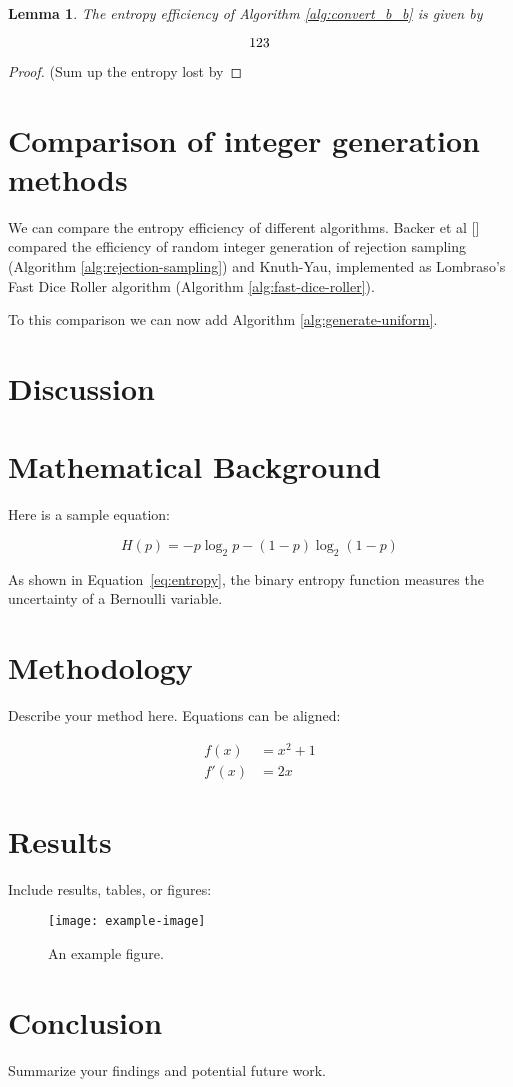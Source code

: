 \documentclass[12pt]{article}
\newtheorem{lemma}{Lemma}
\begin{document}
\begin{lemma}
The entropy efficiency of Algorithm \ref{alg:convert_b_b} is given by 

\begin{equation}
$$123$$
\end{equation}

\end{lemma}

\begin{proof}
(Sum up the entropy lost by 

\end{proof}

\section {Comparison of integer generation methods}

We can compare the entropy efficiency of different algorithms. Backer et al [] compared the efficiency of random integer generation of rejection sampling (Algorithm \ref{alg:rejection-sampling}) and Knuth-Yau, implemented as Lombraso's Fast Dice Roller algorithm (Algorithm \ref{alg:fast-dice-roller}).

To this comparison we can now add Algorithm \ref{alg:generate-uniform}.


\section{Discussion}


\section{Mathematical Background}

Here is a sample equation:

\begin{equation}
H(p) = -p \log_2 p - (1 - p) \log_2(1 - p)
\label{eq:entropy}
\end{equation}

As shown in Equation~\ref{eq:entropy}, the binary entropy function measures the uncertainty of a Bernoulli variable.

\section{Methodology}

Describe your method here. Equations can be aligned:

\begin{align}
f(x) &= x^2 + 1 \\
f'(x) &= 2x
\end{align}

\section{Results}

Include results, tables, or figures:

\begin{figure}[ht]
\centering
\texttt{[image: example-image]}
\caption{An example figure.}
\label{fig:example}
\end{figure}

\section{Conclusion}

Summarize your findings and potential future work.

\printbibliography
\end{document}
